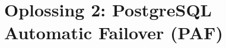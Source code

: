 
\chapter{Oplossing 2: PostgreSQL Automatic Failover (PAF)}

\label{ch:Oplossing 2: PostgreSQL Automatic Failover}



